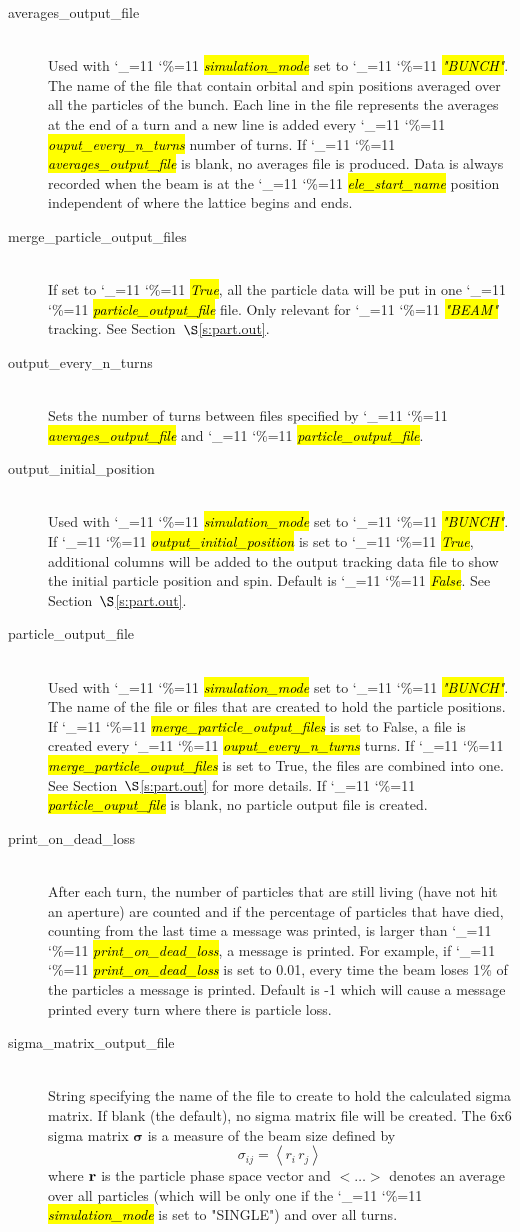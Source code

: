 \documentclass{hitec}
\newcommand\dottcmd[1]{\hl{\em#1}\endgroup}
\newcommand{\vn}{\begingroup\catcode`\_=11 \catcode`\%=11 \dottcmd}
\newcommand{\Newline}{\hfil \\}
\newcommand{\sref}[1]{$\S$\ref{#1}}
\begin{document}
{{{{{{\begin{description}
\item[averages_output_file] \Newline
Used with \vn{simulation_mode} set to \vn{"BUNCH"}. The name of the file that contain orbital and
spin positions averaged over all the particles of the bunch.  Each line in the file represents the
averages at the end of a turn and a new line is added every \vn{ouput_every_n_turns} number of
turns. If \vn{averages_output_file} is blank, no averages file is produced. Data is always recorded
when the beam is at the \vn{ele_start_name} position independent of where the lattice begins and
ends.
%
\item[merge_particle_output_files] \Newline
If set to \vn{True}, all the particle data will be put in one \vn{particle_output_file} file. Only
relevant for \vn{"BEAM"} tracking.  See Section~\sref{s:part.out}.
%
\item[output_every_n_turns] \Newline
Sets the number of turns between files specified by \vn{averages_output_file} and
\vn{particle_output_file}.
%
\item[output_initial_position] \Newline
Used with \vn{simulation_mode} set to \vn{"BUNCH"}. If \vn{output_initial_position} is set to
\vn{True}, additional columns will be added to the output tracking data file to show the initial
particle position and spin. Default is \vn{False}. See Section~\sref{s:part.out}.
%
\item[particle_output_file] \Newline
Used with \vn{simulation_mode} set to \vn{"BUNCH"}. The name of the file or files that are created
to hold the particle positions. If \vn{merge_particle_output_files} is set to False, a file is
created every \vn{ouput_every_n_turns} turns.  If \vn{merge_particle_ouput_files} is set to True,
the files are combined into one. See Section~\sref{s:part.out} for more details. If
\vn{particle_ouput_file} is blank, no particle output file is created.
%
\item[print_on_dead_loss] \Newline
After each turn, the number of particles that are still living (have not hit an aperture) are
counted and if the percentage of particles that have died, counting from the last time a message was
printed, is larger than \vn{print_on_dead_loss}, a message is printed. For example, if
\vn{print_on_dead_loss} is set to 0.01, every time the beam loses 1\% of the particles a message is printed.
Default is -1 which will cause a message printed every turn where there is particle loss.
%
\item[sigma_matrix_output_file] \Newline
String specifying the name of the file to create to hold the calculated sigma matrix. If blank (the
default), no sigma matrix file will be created. The 6x6 sigma matrix $\boldsymbol{\sigma}$ is a
measure of the beam size defined by
\begin{equation}
  \sigma_{ij} = \left< r_i \, r_j \right>
\end{equation}
where $\bf r$ is the particle phase space vector and $<\ldots>$ denotes an average over all
particles (which will be only one if the \vn{simulation_mode} is set to "SINGLE") and over all
turns.
\end{description}

}}}}}}
\end{document}
